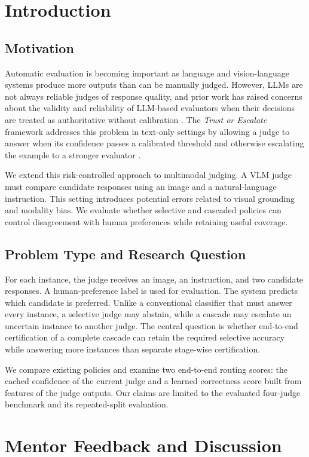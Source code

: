 \documentclass[11pt]{article}
\begin{document}
\section{Introduction}

\subsection{Motivation}
Automatic evaluation is becoming important as language and vision-language systems produce more outputs than can be manually judged. However, LLMs are not always reliable judges of response quality, and prior work has raised concerns about the validity and reliability of LLM-based evaluators when their decisions are treated as authoritative without calibration \citep{chehbouni2025neither}. The \emph{Trust or Escalate} framework addresses this problem in text-only settings by allowing a judge to answer when its confidence passes a calibrated threshold and otherwise escalating the example to a stronger evaluator \citep{jung2024trust}.

We extend this risk-controlled approach to multimodal judging. A VLM judge must compare candidate responses using an image and a natural-language instruction. This setting introduces potential errors related to visual grounding and modality bias. We evaluate whether selective and cascaded policies can control disagreement with human preferences while retaining useful coverage.

\subsection{Problem Type and Research Question}
For each instance, the judge receives an image, an instruction, and two candidate responses. A human-preference label is used for evaluation. The system predicts which candidate is preferred. Unlike a conventional classifier that must answer every instance, a selective judge may abstain, while a cascade may escalate an uncertain instance to another judge. The central question is whether end-to-end certification of a complete cascade can retain the required selective accuracy while answering more instances than separate stage-wise certification.

We compare existing policies and examine two end-to-end routing scores: the cached confidence of the current judge and a learned correctness score built from features of the judge outputs. Our claims are limited to the evaluated four-judge benchmark and its repeated-split evaluation.
\section{Mentor Feedback and Discussion}
\label{sec:mentor-feedback}
\end{document}
